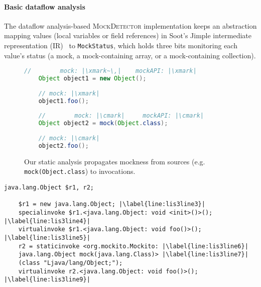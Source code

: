 \paragraph{Basic dataflow analysis} The dataflow analysis-based \textsc{MockDetector} implementation keeps an abstraction mapping values (local variables or field references) in Soot's Jimple intermediate representation (IR)~\cite{Vallee-Rai:1999:SJB:781995.782008} to \texttt{MockStatus}, which holds three bits monitoring each value's status (a mock, a mock-containing array, or a mock-containing collection). %

\begin{figure}[H]
\begin{lstlisting}[basicstyle=\ttfamily,
basicstyle=\scriptsize\ttfamily,language = Java, framesep=4.5mm, framexleftmargin=1.0mm, captionpos=b, escapechar=|, morekeywords={@Test}]
	//        mock: |\xmark~\,|    mockAPI: |\xmark|
	Object object1 = new Object();
	
	// mock: |\xmark|
	object1.foo();
	
	//        mock: |\cmark|     mockAPI: |\cmark|
	Object object2 = mock(Object.class);
	
	// mock: |\cmark|
	object2.foo();
\end{lstlisting}
    
    \caption{Our static analysis propagates mockness from sources (e.g. \texttt{mock(Object.class}) to invocations.}
    \label{fig:mockMethodIllustration}
    
\end{figure}

\begin{lstlisting}[basicstyle=\ttfamily, caption={Jimple Intermediate Representation for the code in Figure~\ref{fig:mockMethodIllustration}.},
basicstyle=\scriptsize\ttfamily, captionpos=b, label=lis:mockMethodIllustrationIR, escapechar=|, morekeywords={@Test, specialinvoke, virtualinvoke, staticinvoke}]
	java.lang.Object $r1, r2;
	
	$r1 = new java.lang.Object; |\label{line:lis3line3}|
	specialinvoke $r1.<java.lang.Object: void <init>()>(); |\label{line:lis3line4}|
	virtualinvoke $r1.<java.lang.Object: void foo()>(); |\label{line:lis3line5}|
	r2 = staticinvoke <org.mockito.Mockito: |\label{line:lis3line6}|
	java.lang.Object mock(java.lang.Class)> |\label{line:lis3line7}|
	(class "Ljava/lang/Object;");
	virtualinvoke r2.<java.lang.Object: void foo()>(); |\label{line:lis3line9}|
\end{lstlisting}


